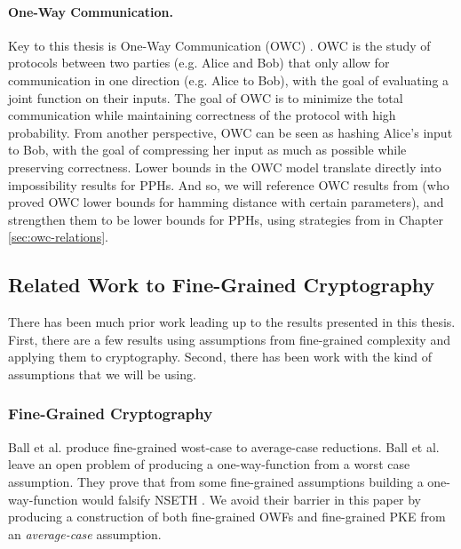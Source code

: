 \paragraph{One-Way Communication.}
Key to this thesis is One-Way Communication (OWC) \cite{Yao79,KNR95}. OWC is the study of protocols between two parties (e.g. Alice and Bob) that only allow for communication in one direction (e.g. Alice to Bob), with the goal of evaluating a joint function on their inputs. The goal of OWC is to minimize the total communication while maintaining correctness of the protocol with high probability. From another perspective, OWC can be seen as hashing Alice's input to Bob, with the goal of compressing her input as much as possible while preserving correctness. Lower bounds in the OWC model translate directly into impossibility results for PPHs. And so, we will reference OWC results from \cite{Woodruff04,Woodruff07,JKS08} (who proved OWC lower bounds for hamming distance with certain parameters), and strengthen them to be lower bounds for PPHs, using strategies from \cite{JKS08} in Chapter \ref{sec:owc-relations}.

\subsection{Related Work to Fine-Grained Cryptography}
There has been much prior work leading up to the results presented in this thesis. First, there are a few results using assumptions from fine-grained complexity and applying them to cryptography. Second, there has been work with the kind of assumptions that we will be using.


\subsubsection{Fine-Grained Cryptography}
Ball et al. \cite{avgCaseFineGrained,eprintAvgCaseFG} produce fine-grained wost-case to average-case reductions. Ball et al. leave an open problem of producing a one-way-function from a worst case assumption. They prove that from some fine-grained assumptions building a one-way-function would falsify NSETH \cite{CarmosinoGIMPS16}\cite{avgCaseFineGrained}.
We avoid their barrier in this paper by producing a construction of both fine-grained OWFs and fine-grained PKE from an \emph{average-case} assumption.

